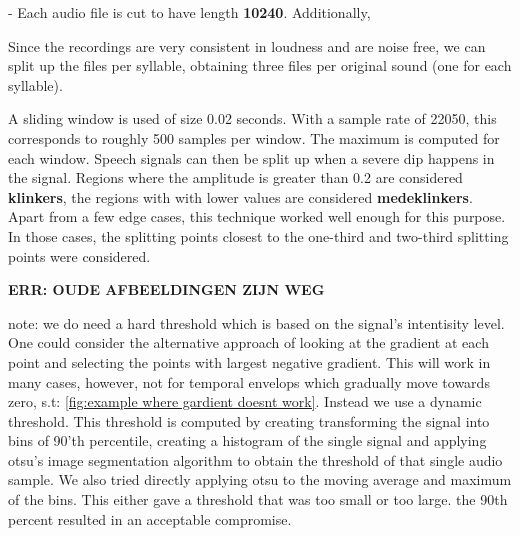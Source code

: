 - Each audio file is cut to have length \textbf{10240}. Additionally, 


Since the recordings are very consistent in loudness and are noise free, we can split up the files per syllable, obtaining three files per original sound (one for each syllable).

A sliding window is used of size 0.02 seconds. With a sample rate of 22050, this corresponds to roughly 500 samples per window. The maximum is computed for each window. Speech signals can then be split up when a severe dip happens in the signal. Regions where the amplitude is greater than 0.2 are considered \textbf{klinkers}, the regions with with lower values are considered \textbf{medeklinkers}. Apart from a few edge cases, this technique worked well enough for this purpose. In those cases, the splitting points closest to the one-third and two-third splitting points were considered.

\textbf{ERR: OUDE AFBEELDINGEN ZIJN WEG}
%



note: we do need a hard threshold which is based on the signal's intentisity level. One could consider the alternative approach of looking at the gradient at each point and selecting the points with largest negative gradient. This will work in many cases, however, not for temporal envelops which gradually move towards zero, s.t: \ref{fig:example where gardient doesnt work}. Instead we use a dynamic threshold. This threshold is computed by creating transforming the signal into bins of 90'th percentile, creating a histogram of the single signal and applying otsu's image segmentation algorithm to obtain the threshold of that single audio sample.
We also tried directly applying otsu to the moving average and maximum of the bins. This either gave a threshold that was too small or too large. the 90th percent resulted in an acceptable compromise.


